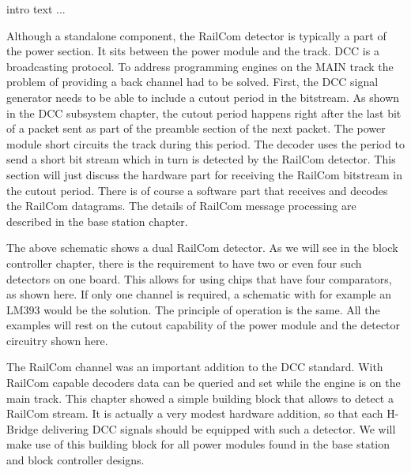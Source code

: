 
intro text ...



Although a standalone component, the RailCom detector is typically a part of the power section. It sits between the power module and the track. DCC is a broadcasting protocol. To address programming engines on the MAIN track the problem of providing a back channel had to be solved. First, the DCC signal generator needs to be able to include a cutout period in the bitstream. As shown in the DCC subsystem chapter, the cutout period happens right after the last bit of a packet sent as part of the preamble section of the next packet. The power module short circuits the track during this period. The decoder uses the period to send a short bit stream which in turn is detected by the RailCom detector. This section will just discuss the hardware part for receiving the RailCom bitstream in the cutout period. There is of course a software part that receives and decodes the RailCom datagrams. The details of RailCom message processing are described in the base station chapter.


The above schematic shows a dual RailCom detector. As we will see in the block controller chapter, there is the requirement to have two or even four such detectors on one board. This allows for using chips that have four comparators, as shown here. If only one channel is required, a schematic with for example an LM393 would be the solution. The principle of operation is the same. All the examples will rest on the cutout capability of the power module and the detector circuitry shown here.




The RailCom channel was an important addition to the DCC standard. With RailCom capable decoders data can be queried and set while the engine is on the main track. This chapter showed a simple building block that allows to detect a RailCom stream. It is actually a very modest hardware addition, so that each H-Bridge delivering DCC signals should be equipped with such a detector. We will make use of this building block for all power modules found in the base station and block controller designs.
